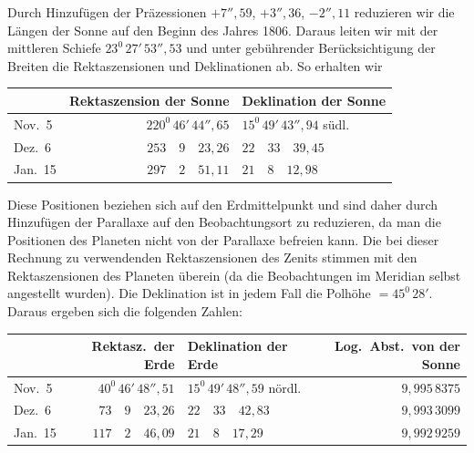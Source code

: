 Durch Hinzufügen der Präzessionen $+7''{,}59$, $+3''{,}36$, $-2''{,}11$ reduzieren wir die Längen der Sonne auf den Beginn des Jahres 1806. Daraus leiten wir mit der mittleren Schiefe $23^{0}\,27'\,53''{,}53$ und unter gebührender Berücksichtigung der Breiten die Rektaszensionen und Deklinationen ab. So erhalten wir
\begin{center}
\begingroup\small\setlength{\tabcolsep}{5pt}\renewcommand{\arraystretch}{1.2}
\begin{tabular}{|l|r|l|}\hline
& Rektaszension der Sonne & Deklination der Sonne\\\hline
Nov.\ 5 & $220^{0}\,46'\,44''{,}65$ & $15^{0}\,49'\,43''{,}94$ südl.\\
Dez.\ 6 & $253\quad9\quad23{,}26$ & $22\quad33\quad39{,}45$\\
Jan.\ 15 & $297\quad2\quad51{,}11$ & $21\quad8\quad12{,}98$\\\hline
\end{tabular}\endgroup
\end{center}

Diese Positionen beziehen sich auf den Erdmittelpunkt und sind daher durch Hinzufügen der Parallaxe auf den Beobachtungsort zu reduzieren, da man die Positionen des Planeten nicht von der Parallaxe befreien kann. Die bei dieser Rechnung zu verwendenden Rektaszensionen des Zenits stimmen mit den Rektaszensionen des Planeten überein (da die Beobachtungen im Meridian selbst angestellt wurden). Die Deklination ist in jedem Fall die Polhöhe $=45^{0}\,28'$. Daraus ergeben sich die folgenden Zahlen:
\begin{center}
\begingroup\footnotesize\setlength{\tabcolsep}{3pt}\renewcommand{\arraystretch}{1.2}
\begin{tabular}{|l|r|l|r|}\hline
& Rektasz.\ der Erde & Deklination der Erde & Log.\ Abst.\ von der Sonne\\\hline
Nov.\ 5 & $40^{0}\,46'\,48''{,}51$ & $15^{0}\,49'\,48''{,}59$ nördl. & $9{,}995\,8375$\\
Dez.\ 6 & $73\quad9\quad23{,}26$ & $22\quad33\quad42{,}83$ & $9{,}993\,3099$\\
Jan.\ 15 & $117\quad2\quad46{,}09$ & $21\quad8\quad17{,}29$ & $9{,}992\,9259$\\\hline
\end{tabular}\endgroup
\end{center}

